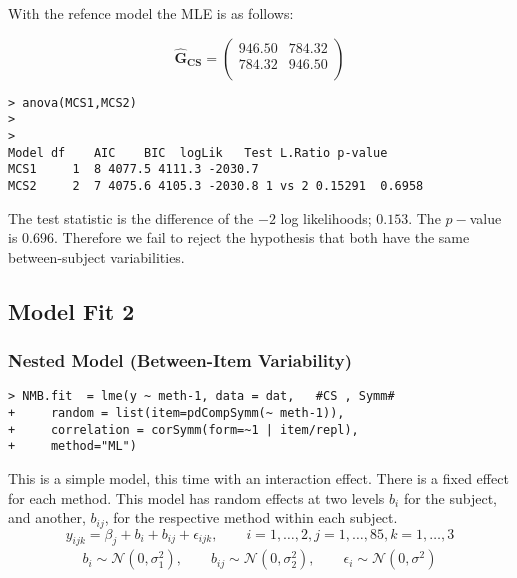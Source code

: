 With the refence model the MLE is as follows:

\begin{equation}
\boldsymbol{\hat{G}_{CS}} = \left( \begin{array}{cc}
946.50 & 784.32  \\
784.32 & 946.50  \\
\end{array}\right)
\end{equation}

\begin{framed}
\begin{verbatim}
> anova(MCS1,MCS2)
>
>
Model df    AIC    BIC  logLik   Test L.Ratio p-value
MCS1     1  8 4077.5 4111.3 -2030.7
MCS2     2  7 4075.6 4105.3 -2030.8 1 vs 2 0.15291  0.6958
\end{verbatim}
\end{framed}

The test statistic is the difference of the $-2$ log likelihoods; $0.153$. The $p-$value is $0.696$. Therefore we fail to reject the hypothesis that both have the same between-subject variabilities.

\subsection{Model Fit 2}
\subsubsection{Nested Model (Between-Item Variability)}
\begin{framed}
\begin{verbatim}
> NMB.fit  = lme(y ~ meth-1, data = dat,   #CS , Symm#
+     random = list(item=pdCompSymm(~ meth-1)),
+     correlation = corSymm(form=~1 | item/repl), 
+     method="ML")
\end{verbatim}
\end{framed}



This is a simple model, this time with an interaction effect.
There is a fixed effect for each method. This model has random effects at two levels $b_{i}$ for the subject, and
another, $b_{ij}$, for the respective method within each subject.
\begin{equation*}
y_{ijk} = \beta_{j}  + b_{i} + b_{ij} + \epsilon_{ijk}, \qquad i=1,\dots,2, j=1,\dots,85, k=1,\dots,3
\end{equation*}
\begin{eqnarray*}
b_{i} \sim \mathcal{N}(0,\sigma^2_{1}), \qquad b_{ij} \sim \mathcal{N}(0,\sigma^2_{2}), \qquad \epsilon_{i} \sim \mathcal{N}(0,\sigma^2)
\end{eqnarray*}

